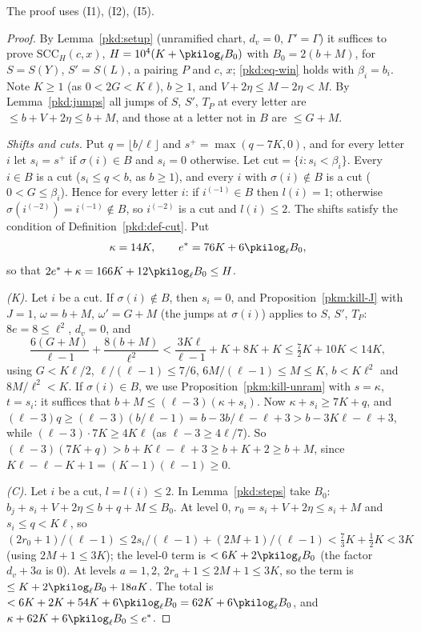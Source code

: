 \documentclass[10pt]{amsart}
\theoremstyle{definition}
\theoremstyle{remark}
\begin{document}
The proof uses (I1), (I2), (I5).

\begin{proof}
By Lemma~\ref{pkd:setup} (unramified chart, $d_v=0$, $\Gamma'=\Gamma$) it suffices to prove
$\mathrm{SCC}_H(c,x)$, $H=10^4(K+\pkilog_\ell B_0)$ with $B_0=2(b+M)$, for $S=S(Y)$, $S'=S(L)$, a pairing
$P$ and $c$, $x$; \eqref{pkd:eq-win} holds with $\beta_i=b_i$. Note $K\ge1$ (as $0<2G<K\ell$), $b\ge1$,
and $V+2\eta\le M-2\eta<M$. By Lemma~\ref{pkd:jumps} all jumps of $S$, $S'$, $T_P$ at every letter are
$\le b+V+2\eta\le b+M$, and those at a letter not in $B$ are $\le G+M$.

\emph{Shifts and cuts.} Put $q=\lfloor b/\ell\rfloor$ and $s^+=\max(q-7K,0)$, and for every letter $i$
let $s_i=s^+$ if $\sigma(i)\in B$ and $s_i=0$ otherwise. Let $\mathrm{cut}=\{i:s_i<\beta_i\}$. Every
$i\in B$ is a cut ($s_i\le q<b$, as $b\ge1$), and every $i$ with $\sigma(i)\notin B$ is a cut
($0<G\le\beta_i$). Hence for every letter $i$: if $i^{(-1)}\in B$ then $l(i)=1$; otherwise
$\sigma(i^{(-2)})=i^{(-1)}\notin B$, so $i^{(-2)}$ is a cut and $l(i)\le2$. The shifts satisfy the
condition of Definition~\ref{pkd:def-cut}. Put
\[
\kappa=14K,\qquad e^*=76K+6\pkilog_\ell B_0,
\]
so that $2e^*+\kappa=166K+12\pkilog_\ell B_0\le H$.

\emph{(K).} Let $i$ be a cut. If $\sigma(i)\notin B$, then $s_i=0$, and Proposition~\ref{pkm:kill-J}
with $J=1$, $\omega=b+M$, $\omega'=G+M$ (the jumps at $\sigma(i)$) applies to $S$, $S'$, $T_P$:
$8e=8\le\ell^2$, $d_v=0$, and
\[
\frac{6(G+M)}{\ell-1}+\frac{8(b+M)}{\ell^2}<\frac{3K\ell}{\ell-1}+K+8K+K\le\tfrac72K+10K<14K,
\]
using $G<K\ell/2$, $\ell/(\ell-1)\le7/6$, $6M/(\ell-1)\le M\le K$, $b<K\ell^2$ and $8M/\ell^2<K$. If
$\sigma(i)\in B$, we use Proposition~\ref{pkm:kill-unram} with $s=\kappa$, $t=s_i$: it suffices that
$b+M\le(\ell-3)(\kappa+s_i)$. Now $\kappa+s_i\ge7K+q$, and $(\ell-3)q\ge(\ell-3)(b/\ell-1)=b-3b/\ell-\ell+3
>b-3K\ell-\ell+3$, while $(\ell-3)\cdot7K\ge4K\ell$ (as $\ell-3\ge4\ell/7$). So
$(\ell-3)(7K+q)>b+K\ell-\ell+3\ge b+K+2\ge b+M$, since $K\ell-\ell-K+1=(K-1)(\ell-1)\ge0$.

\emph{(C).} Let $i$ be a cut, $l=l(i)\le2$. In Lemma~\ref{pkd:steps} take $B_0$: $b_j+s_i+V+2\eta\le
b+q+M\le B_0$. At level $0$, $r_0=s_i+V+2\eta\le s_i+M$ and $s_i\le q<K\ell$, so
$(2r_0+1)/(\ell-1)\le 2s_i/(\ell-1)+(2M+1)/(\ell-1)<\tfrac73K+\tfrac12K<3K$ (using $2M+1\le3K$); the
level-$0$ term is $<6K+2\pkilog_\ell B_0$ (the factor $d_v+3a$ is $0$). At levels $a=1,2$,
$2r_a+1\le2M+1\le3K$, so the term is $\le K+2\pkilog_\ell B_0+18aK$. The total is
$<6K+2K+54K+6\pkilog_\ell B_0=62K+6\pkilog_\ell B_0$, and $\kappa+62K+6\pkilog_\ell B_0\le e^*$.


\end{proof}
\end{document}
